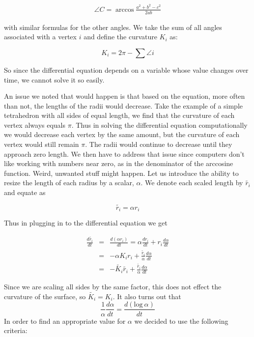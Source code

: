 \documentclass[12pt]{article}
\begin{document}
  \begin{eqnarray*}
  \angle C = \arccos\frac{a^2 + b^2 - c^2}{2ab}
  \end{eqnarray*} 
  
\noindent with similar formulas for the other angles. We take the sum of all angles associated with a vertex $i$ and define the curvature $K_i$ as:

  \begin{equation}
  K_i = 2\pi - \sum{\angle i}
  \end{equation}
  
\noindent So since the differential equation depends on a variable whose value changes over time, we cannot solve it so easily.\newline
   
\noindent An issue we noted that would happen is that based on the equation, more often than not, the lengths of the radii would decrease. Take the example of a simple tetrahedron with all sides of equal length, we find that the curvature of each vertex always equals $\pi$. Thus in solving the differential equation computationally we would decrease each vertex by the same amount, but the curvature of each vertex would still remain $\pi$. The radii would continue to decrease until they approach zero length. We then have to address that issue since computers don't like working with numbers near zero, as in the denominator of the arccosine function. Weird, unwanted stuff might happen. Let us introduce the ability to resize the length of each radius by a scalar, $\alpha$. We denote each scaled length by $\tilde{r_i}$ and equate as
 
 \begin{equation}
 \tilde{r_i} = \alpha r_i
 \end{equation} 
 
\noindent Thus in plugging in to the differential equation we get
 
 \begin{eqnarray}
 \label{ref1}
 \frac{d\tilde{r_i}}{dt} &=& \frac{d(\alpha r_i)}{dt} = \alpha \frac{dr_i}{dt} + r_i\frac{d\alpha}{dt}\nonumber\\
 &=& -\alpha K_ir_i + \frac{\tilde{r_i}}{\alpha}\frac{d\alpha}{dt} \nonumber \\
 &=& -\tilde{K_i}\tilde{r_i} + \frac{\tilde{r_i}}{\alpha}\frac{d\alpha}{dt}
 \end{eqnarray}
 
\noindent Since we are scaling all sides by the same factor, this does not effect the curvature of the surface, so $\tilde{K_i} = K_i$. It also turns out that $$\displaystyle \frac{1}{\alpha} \frac{d\alpha}{dt} = \frac{d(\mbox{log}~\alpha)}{dt}$$ 
 In order to find an appropriate value for $\alpha$ we decided to use the following criteria:
 
\end{document}
